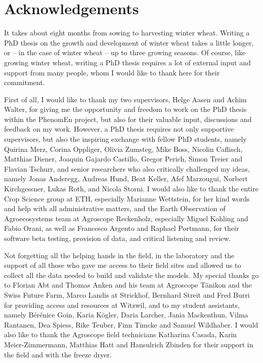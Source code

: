 \chapter*{Acknowledgements}
\renewcommand{\sectionmark}[1]{ \markright{ \MakeUppercase{#1} } }

It takes about eight months from sowing to harvesting winter wheat. Writing a PhD thesis on the growth and development of winter wheat takes a little longer, or -- in the case of winter wheat -- up to three growing seasons. Of course, like growing winter wheat, writing a PhD thesis requires a lot of external input and support from many people, whom I would like to thank here for their commitment.

First of all, I would like to thank my two supervisors, Helge Aasen and Achim Walter, for giving me the opportunity and freedom to work on the PhD thesis within the PhenomEn project, but also for their valuable input, discussions and feedback on my work. However, a PhD thesis requires not only supportive supervisors, but also the inspiring exchange with fellow PhD students, namely Quirina Merz, Corina Oppliger, Olivia Zumsteg, Mike Boss, Nicolin Caflisch, Matthias Diener, Joaquin Gajardo Castillo, Gregor Perich, Simon Treier and Flavian Tschurr, and senior researchers who also critically challenged my ideas, namely Jonas Anderegg, Andreas Hund, Beat Keller, Afef Marzougui, Norbert Kirchgessner, Lukas Roth, and Nicola Storni. I would also like to thank the entire Crop Science group at ETH, especially Marianne Wettstein, for her kind words and help with all administrative matters, and the Earth Observation of Agroecosystems team at Agroscope Reckenholz, especially Miguel Kohling and Fabio Orani, as well as Francesco Argento and Raphael Portmann, for their software beta testing, provision of data, and critical listening and review.

Not forgetting all the helping hands in the field, in the laboratory and the support of all those who gave me access to their field sites and allowed us to collect all the data needed to build and validate the models. My special thanks go to Florian Abt and Thomas Anken and his team at Agroscope Tänikon and the Swiss Future Farm, Marco Landis at Strickhof, Bernhard Streit and Fred Burri for providing access and resources at Witzwil, and to my student assistants, namely Bérénice Goin, Karia Kögler, Daria Larcher, Jania Mackenthun, Vilma Rantanen, Dea Spiess, Rike Teuber, Finn Timcke and Samuel Wildhaber. I would also like to thank the Agroscope field technicians Katharina Casada, Karin Meier-Zimmermann, Matthias Hatt and Hansulrich Zbinden for their support in the field and with the freeze dryer.

